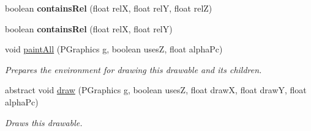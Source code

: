 \begin{DoxyCompactItemize}
\item 
\hypertarget{classhype_1_1core_1_1drawable_1_1_h_drawable_a8ae24b40927238f1be71ad4ff3120874}{boolean {\bfseries contains\-Rel} (float rel\-X, float rel\-Y, float rel\-Z)}\label{classhype_1_1core_1_1drawable_1_1_h_drawable_a8ae24b40927238f1be71ad4ff3120874}

\item 
\hypertarget{classhype_1_1core_1_1drawable_1_1_h_drawable_acd096b75e5eb22539a74db0528bf14a7}{boolean {\bfseries contains\-Rel} (float rel\-X, float rel\-Y)}\label{classhype_1_1core_1_1drawable_1_1_h_drawable_acd096b75e5eb22539a74db0528bf14a7}

\item 
void \hyperlink{classhype_1_1core_1_1drawable_1_1_h_drawable_ac66170a2cfce900a6ffa69696fd7c766}{paint\-All} (P\-Graphics g, boolean uses\-Z, float alpha\-Pc)
\begin{DoxyCompactList}\small\item\em Prepares the environment for drawing this drawable and its children. \end{DoxyCompactList}\item 
abstract void \hyperlink{classhype_1_1core_1_1drawable_1_1_h_drawable_a7a595e461771afe3957324bf42d2ef95}{draw} (P\-Graphics g, boolean uses\-Z, float draw\-X, float draw\-Y, float alpha\-Pc)
\begin{DoxyCompactList}\small\item\em Draws this drawable. \end{DoxyCompactList}\end{DoxyCompactItemize}

